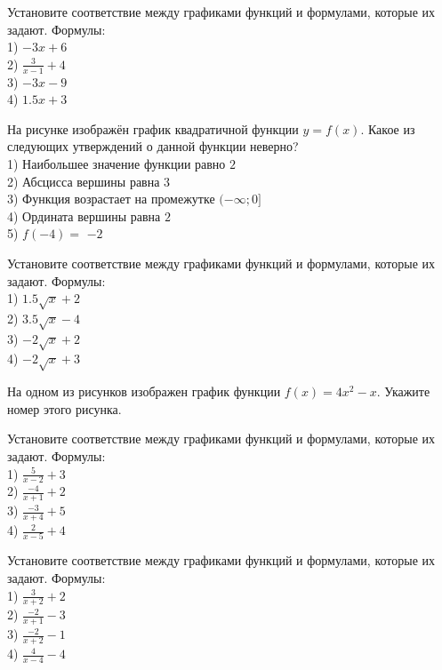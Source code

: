 \documentclass[4apaper]{article}
\begin{document}
\begin{taskBN}{59}
Установите соответствие между графиками функций и формулами, которые их задают. Формулы: \\1) $-3x+6$\\2) $\frac{3}{x-1}+4$\\3) $-3x-9$\\4) $1.5x+3$
\end{taskBN}

\begin{taskBN}{60}
На рисунке изображён график квадратичной функции $y=f(x)$. Какое из следующих утверждений о данной функции неверно?\\1) Наибольшее значение функции равно  $2$\\2) Абсцисса вершины равна $3$\\3) Функция возрастает на промежутке $(-\infty;0]$\\4) Ордината вершины равна $2$\\5) $f(-4)=$ $-2$
\end{taskBN}

\begin{taskBN}{61}
Установите соответствие между графиками функций и формулами, которые их задают. Формулы: \\1) $1.5\sqrt{x}+2$\\2) $3.5\sqrt{x}-4$\\3) $-2\sqrt{x}+2$\\4) $-2\sqrt{x}+3$
\end{taskBN}

\begin{taskBN}{62}
На одном из рисунков изображен график функции $f(x)=4x^2-x$. Укажите номер этого рисунка.
\end{taskBN}

\begin{taskBN}{63}
Установите соответствие между графиками функций и формулами, которые их задают. Формулы: \\1) $\frac{5}{x-2}+3$\\2) $\frac{-4}{x+1}+2$\\3) $\frac{-3}{x+4}+5$\\4) $\frac{2}{x-5}+4$
\end{taskBN}

\begin{taskBN}{64}
Установите соответствие между графиками функций и формулами, которые их задают. Формулы: \\1) $\frac{3}{x+2}+2$\\2) $\frac{-2}{x+1}-3$\\3) $\frac{-2}{x+2}-1$\\4) $\frac{4}{x-4}-4$
\end{taskBN}
\end{document}
